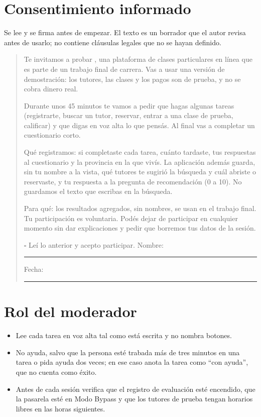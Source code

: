\section{Consentimiento informado}

Se lee y se firma antes de empezar. El texto es un borrador que el autor
revisa antes de usarlo; no contiene cláusulas legales que no se hayan
definido.

\begin{quote}
Te invitamos a probar \sistema{}, una plataforma de clases particulares
en línea que es parte de un trabajo final de carrera. Vas a usar una
versión de demostración: los tutores, las clases y los pagos son de
prueba, y no se cobra dinero real.

Durante unos 45 minutos te vamos a pedir que hagas algunas tareas
(registrarte, buscar un tutor, reservar, entrar a una clase de prueba,
calificar) y que digas en voz alta lo que pensás. Al final vas a
completar un cuestionario corto.

Qué registramos: si completaste cada tarea, cuánto tardaste, tus
respuestas al cuestionario y la provincia en la que vivís. La aplicación
además guarda, sin tu nombre a la vista, qué tutores te sugirió la
búsqueda y cuál abriste o reservaste, y tu respuesta a la pregunta de
recomendación (0 a 10). No guardamos el texto que escribas en la
búsqueda.

Para qué: los resultados agregados, sin nombres, se usan en el trabajo
final. Tu participación es voluntaria. Podés dejar de participar en
cualquier momento sin dar explicaciones y pedir que borremos tus datos
de la sesión.

$\square$ Leí lo anterior y acepto participar. Nombre: \rule{4cm}{0.4pt}
Fecha: \rule{2.5cm}{0.4pt}
\end{quote}

\section{Rol del moderador}

\begin{itemize}
    \item Lee cada tarea en voz alta tal como está escrita y no nombra
          botones.
    \item No ayuda, salvo que la persona esté trabada más de tres minutos
          en una tarea o pida ayuda dos veces; en ese caso anota la tarea
          como ``con ayuda'', que no cuenta como éxito.
    \item Antes de cada sesión verifica que el registro de evaluación esté
          encendido, que la pasarela esté en Modo Bypass y que los tutores
          de prueba tengan horarios libres en las horas siguientes.
\end{itemize}

